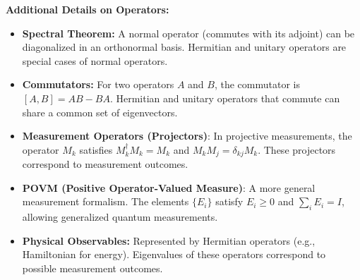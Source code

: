 \documentclass{article}
\begin{document}
\textbf{Additional Details on Operators:}
\begin{itemize}
    \item \textbf{Spectral Theorem:} A normal operator (commutes with its adjoint) can be diagonalized in an orthonormal basis. Hermitian and unitary operators are special cases of normal operators.
    \item \textbf{Commutators:} For two operators \(A\) and \(B\), the commutator is \([A,B] = AB - BA\). Hermitian and unitary operators that commute can share a common set of eigenvectors.
    \item \textbf{Measurement Operators (Projectors)}: In projective measurements, the operator \(M_k\) satisfies \(M_k^\dagger M_k = M_k\) and \(M_k M_j = \delta_{kj} M_k\). These projectors correspond to measurement outcomes.
    \item \textbf{POVM (Positive Operator-Valued Measure)}: A more general measurement formalism. The elements \(\{E_i\}\) satisfy \(E_i \ge 0\) and \(\sum_i E_i = I\), allowing generalized quantum measurements.
    \item \textbf{Physical Observables:} Represented by Hermitian operators (e.g., Hamiltonian for energy). Eigenvalues of these operators correspond to possible measurement outcomes.
\end{itemize}

\newpage
\end{document}
